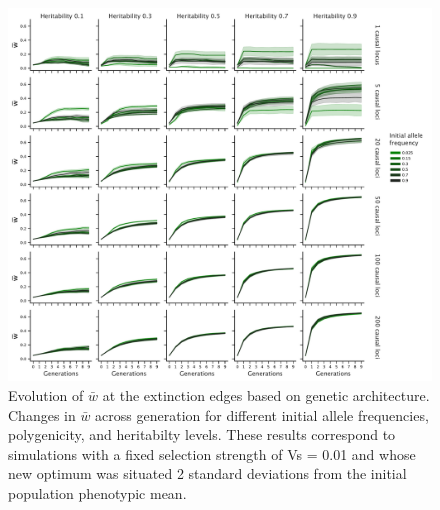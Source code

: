 \documentclass{article}
\begin{document}
\begin{figure}[H]
    \centering
    \includegraphics[width=1\textwidth]{figures/mean_fitness_acrossgen.pdf}
    \caption{Evolution of $\bar{w}$ at the extinction edges based on genetic architecture. Changes in $\bar{w}$ across generation for different initial allele frequencies, polygenicity, and heritabilty levels. These results correspond to simulations with a fixed selection strength of Vs = 0.01 and whose new optimum was situated 2 standard deviations from the initial population phenotypic mean.}
    \label{fig:mean_fitness_acrossgen}
\end{figure}
\end{document}
